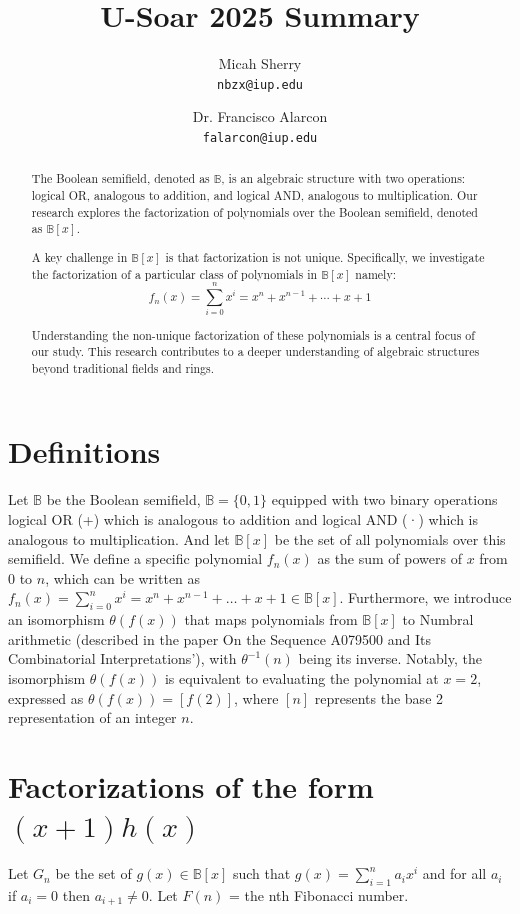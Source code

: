 \documentclass{article}
\title{U-Soar 2025 Summary}
\author{
    Micah Sherry \\
    \texttt{nbzx@iup.edu}
    \and
    Dr. Francisco Alarcon\\
    \texttt{falarcon@iup.edu}
}
\newcommand{\B}{\mathbb{B}}
\begin{document}
    \maketitle

    \begin{abstract}
        The Boolean semifield, denoted as $\B$, is an algebraic structure with two operations: logical OR, analogous to addition, and
        logical AND, analogous to multiplication. Our research explores the factorization of polynomials over the Boolean semifield, denoted as $\B[x]$.
        
        A key challenge in $\B[x]$ is that factorization is not unique. Specifically, we investigate the factorization of a particular
        class of polynomials in $\B[x]$ namely: $$f_n(x) = \sum_{i=0}^{n} x^i = x^n + x^{n-1} + \cdots + x + 1$$
        
        Understanding the non-unique factorization of these polynomials is a central focus of our study. This research contributes to a
        deeper understanding of algebraic structures beyond traditional fields and rings.
    \end{abstract}

    \section{Definitions}
        Let $\B$ be the Boolean semifield, $\B = \{0, 1\}$  equipped with two binary operations logical OR (+) which is analogous to addition and logical AND (·)
        which is analogous to multiplication. And let $\B[x]$ be the set of all polynomials over this semifield.
        We define a specific polynomial $f_n(x)$ as the sum of powers of $x$ from $0$ to $n$, which can be written as 
            $f_n(x) = \sum_{i=0}^n x^i = x^n + x^{n-1} + \dots + x + 1 \in \B[x]$.
        Furthermore, we introduce an isomorphism $\theta(f(x))$ that maps polynomials from $\mathbb{B}[x]$ to Numbral arithmetic
        (described in the paper On the Sequence A079500 and Its Combinatorial Interpretations'),
        with $\theta^{-1}(n)$ being its inverse. Notably, the isomorphism $\theta(f(x))$ is equivalent to evaluating the polynomial at $x=2$,
        expressed as $\theta(f(x)) = [f(2)]$, where $[n]$ represents the base 2 representation of an integer $n$.

    \section{Factorizations of the form $(x+1)h(x)$}
        Let $G_n$ be the set of $g(x) \in \B[x]$ such that $g(x) = \sum_{i=1}^n a_ix^i$
        and for all $a_i$ if $a_i = 0$ then $a_{i+1}\neq 0$.
        Let $F(n)$ = the nth Fibonacci number.
\end{document}
